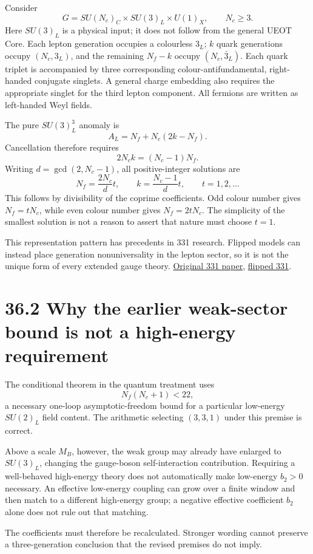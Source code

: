 \documentclass[
  11pt,
  oneside]{book}
\begin{document}
Consider \[
G=SU(N_c)_C\times SU(3)_L\times U(1)_X,\qquad N_c\ge3.
\] Here \(SU(3)_L\) is a physical input; it does not follow from the
general UEOT Core. Each lepton generation occupies a colourless \(3_L\);
\(k\) quark generations occupy \((N_c,3_L)\), and the remaining
\(N_f-k\) occupy \((N_c,\bar3_L)\). Each quark triplet is accompanied by
three corresponding colour-antifundamental, right-handed conjugate
singlets. A general charge embedding also requires the appropriate
singlet for the third lepton component. All fermions are written as
left-handed Weyl fields.

The pure \(SU(3)_L^3\) anomaly is \[
A_L=N_f+N_c(2k-N_f).
\] Cancellation therefore requires \[
2N_ck=(N_c-1)N_f.
\] Writing \(d=\gcd(2,N_c-1)\), all positive-integer solutions are \[
N_f=\frac{2N_c}{d}t,\qquad
k=\frac{N_c-1}{d}t,\qquad t=1,2,\ldots
\tag{36.1}
\] This follows by divisibility of the coprime coefficients. Odd colour
number gives \(N_f=tN_c\), while even colour number gives \(N_f=2tN_c\).
The simplicity of the smallest solution is not a reason to assert that
nature must choose \(t=1\).

This representation pattern has precedents in 331 research. Flipped
models can instead place generation nonuniversality in the lepton
sector, so it is not the unique form of every extended gauge theory.
\href{https://arxiv.org/abs/hep-ph/9206242}{Original 331 paper},
\href{https://arxiv.org/abs/1606.01109}{flipped 331}.

\section{36.2 Why the earlier weak-sector bound is not a high-energy
requirement}

The conditional theorem in the quantum treatment uses \[
N_f(N_c+1)<22,
\tag{36.2}
\] a necessary one-loop asymptotic-freedom bound for a particular
low-energy \(SU(2)_L\) field content. The arithmetic selecting
\((3,3,1)\) under this premise is correct.

Above a scale \(M_B\), however, the weak group may already have enlarged
to \(SU(3)_L\), changing the gauge-boson self-interaction contribution.
Requiring a well-behaved high-energy theory does not automatically make
low-energy \(b_2>0\) necessary. An effective low-energy coupling can
grow over a finite window and then match to a different high-energy
group; a negative effective coefficient \(b_2\) alone does not rule out
that matching.

The coefficients must therefore be recalculated. Stronger wording cannot
preserve a three-generation conclusion that the revised premises do not
imply.
\end{document}

